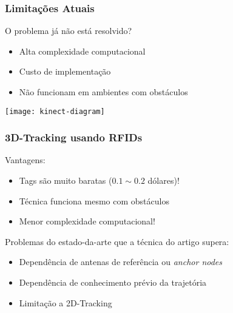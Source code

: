 \begin{frame}
    \frametitle{Limitações Atuais}

    O problema já não está resolvido?

    \begin{itemize}
    \item  Alta complexidade computacional
    \item  Custo de implementação
    \item  Não funcionam em ambientes com obstáculos
    \end{itemize}

    \begin{center}
        \texttt{[image: kinect-diagram]}
    \end{center}
\end{frame}


\begin{frame}
    \frametitle{3D-Tracking usando RFIDs}

    Vantagens:
    \begin{itemize}
    \item  \alert{Tags são muito baratas} ($0.1 \sim 0.2$ dólares)!
    \item  Técnica \alert{funciona mesmo com obstáculos}
    \item  \alert{Menor complexidade computacional}!
    \end{itemize}

    Problemas do estado-da-arte que a técnica do artigo supera:
    \begin{itemize}
    \item  Dependência de antenas de referência ou \emph{anchor nodes}
    \item  Dependência de conhecimento prévio da trajetória
    \item  Limitação a 2D-Tracking
    \end{itemize}
\end{frame}
